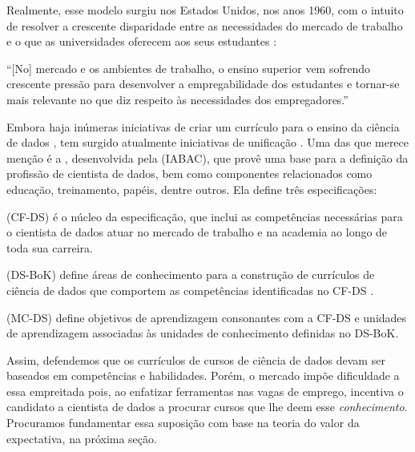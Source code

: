 Realmente, esse modelo surgiu nos Estados Unidos, nos anos 1960, com o intuito de resolver a crescente disparidade entre as necessidades do mercado de trabalho e o que as universidades oferecem aos seus estudantes \cite{Zulauf2006}: 

\begin{mycitation}
	``[No] mercado e os ambientes de trabalho, o ensino superior vem sofrendo crescente pressão para desenvolver a empregabilidade dos estudantes e tornar-se mais relevante no que diz respeito às necessidades dos empregadores.''
\end{mycitation}

Embora haja inúmeras iniciativas  de criar um currículo para o ensino da ciência de dados \cite{Hassan2019, Anderson2014, Cheng2019}, tem surgido atualmente iniciativas de unificação \cite{Raj2019}.
Uma das que merece menção é a , desenvolvida pela  (IABAC), que provê uma base para a definição da profissão de cientista de dados, bem como componentes relacionados como educação, treinamento, papéis, dentre outros.
Ela define três especificações:
\begin{compactitem}
	\item {} (CF-DS) é o núcleo da especificação, que inclui as competências necessárias para o cientista de dados atuar no mercado de trabalho e na academia ao longo de toda sua carreira.
	\item {} (DS-BoK) define áreas de conhecimento para a construção de currículos de ciência de dados que comportem as competências identificadas no CF-DS \cite{Demchenko2017}.
	\item {} (MC-DS) define objetivos de aprendizagem consonantes com a CF-DS e unidades de aprendizagem associadas às unidades de conhecimento definidas no DS-BoK.
\end{compactitem}

Assim, defendemos que os currículos de cursos de ciência de dados devam ser baseados em competências e habilidades.
Porém, o mercado impõe dificuldade a essa empreitada pois, ao enfatizar ferramentas nas vagas de emprego, incentiva o candidato a cientista de dados a procurar cursos que lhe deem esse \emph{conhecimento}.
Procuramos fundamentar essa suposição com base na teoria do valor da expectativa, na próxima seção.

